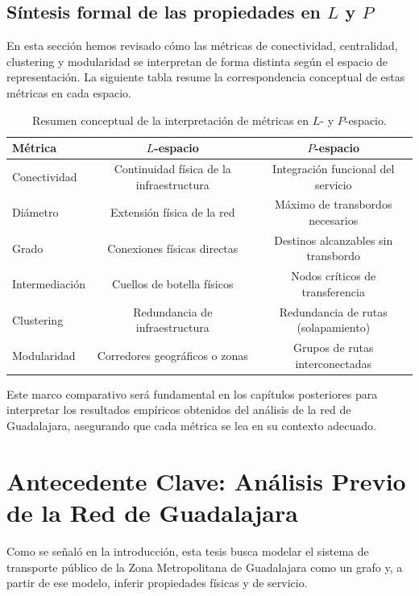         \subsection{Síntesis formal de las propiedades en $L$ y $P$}

        En esta sección hemos revisado cómo las métricas de conectividad, centralidad, clustering y modularidad se interpretan de forma distinta según el espacio de representación. La siguiente tabla resume la correspondencia conceptual de estas métricas en cada espacio.

        \begin{table}[H]
        \centering
        \begin{tabular}{lcc}
        \toprule
        Métrica & $L$-espacio & $P$-espacio \\
        \midrule
        Conectividad & Continuidad física de la infraestructura & Integración funcional del servicio \\
        Diámetro & Extensión física de la red & Máximo de transbordos necesarios \\
        Grado & Conexiones físicas directas & Destinos alcanzables sin transbordo \\
        Intermediación & Cuellos de botella físicos & Nodos críticos de transferencia \\
        Clustering & Redundancia de infraestructura & Redundancia de rutas (solapamiento) \\
        Modularidad & Corredores geográficos o zonas & Grupos de rutas interconectadas \\
        \bottomrule
        \end{tabular}
        \caption{Resumen conceptual de la interpretación de métricas en $L$- y $P$-espacio.}
        \end{table}

        Este marco comparativo será fundamental en los capítulos posteriores para interpretar los resultados empíricos obtenidos del análisis de la red de Guadalajara, asegurando que cada métrica se lea en su contexto adecuado.

    \section{Antecedente Clave: Análisis Previo de la Red de Guadalajara}

        Como se señaló en la introducción, esta tesis busca modelar el sistema de transporte público de la Zona Metropolitana de Guadalajara como un grafo y, a partir de ese modelo, inferir propiedades físicas y de servicio.
        
